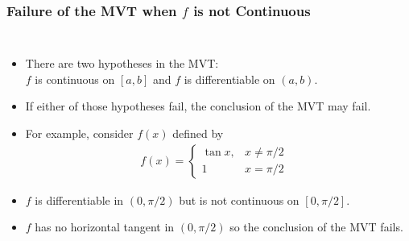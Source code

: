 \documentclass[serif,ignorenonframetext]{beamer}
\begin{document}
\begin{frame}
  \frametitle{Failure of the MVT when $f$ is not Continuous}
  \begin{columns}
  \begin{itemize}[<+->]
  \item There are two hypotheses in the MVT: \\
    $f$ is continuous
    on $[a,b]$ and $f$ is differentiable on $(a,b)$.
  \item If either of those hypotheses fail, the conclusion of
    the MVT may fail.
  \item For example, consider $f(x)$ defined by
    \begin{align*}
      f(x)=\begin{cases}
        \tan x, &\mbox{$x\ne \pi/2$} \\
	1       &\mbox{$x=\pi/2$}
      \end{cases}
    \end{align*}
  \item $f$ is differentiable in $(0,\pi/2)$ but is not
    continuous on $[0,\pi/2]$.
  \item $f$ has no horizontal tangent in $(0,\pi/2)$ so
    the conclusion of the MVT fails.
  \end{itemize}
  \end{columns}
\end{frame}
\end{document}
